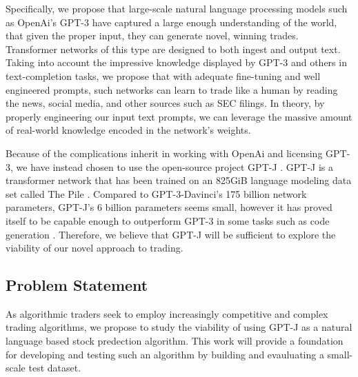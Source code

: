 \documentclass[conference]{IEEEtran}
\begin{document}
Specifically, we propose that large-scale natural language processing models such as OpenAi's GPT-3 \cite{Brown2020} have captured a large enough understanding of the world, that given the proper input, they can generate novel, winning trades. Transformer networks of this type are designed to both ingest and output text. Taking into account the impressive knowledge displayed by GPT-3 and others in text-completion tasks, we propose that with adequate fine-tuning and well engineered prompts, such networks can learn to trade like a human by reading the news, social media, and other sources such as SEC filings. In theory, by properly engineering our input text prompts, we can leverage the massive amount of real-world knowledge encoded in the network's weights.

Because of the complications inherit in working with OpenAi and licensing GPT-3, we have instead chosen to use the open-source project GPT-J \cite{mesh-transformer-jax}. GPT-J is a transformer network \cite{Vaswani2017} that has been trained on an 825GiB language modeling data set called The Pile \cite{Gao2021}. Compared to GPT-3-Davinci's 175 billion network parameters, GPT-J's 6 billion parameters seems small, however it has proved itself to be capable enough to outperform GPT-3 in some tasks such as code generation \cite{forefront}. Therefore, we believe that GPT-J will be sufficient to explore the viability of our novel approach to trading.



\subsection{Problem Statement}
As algorithmic traders seek to employ increasingly competitive and complex trading algorithms, we propose to study the viability of using GPT-J as a natural language based stock predection algorithm. This work will provide a foundation for developing and testing such an algorithm by building and evauluating a small-scale test dataset. 
\end{document}
